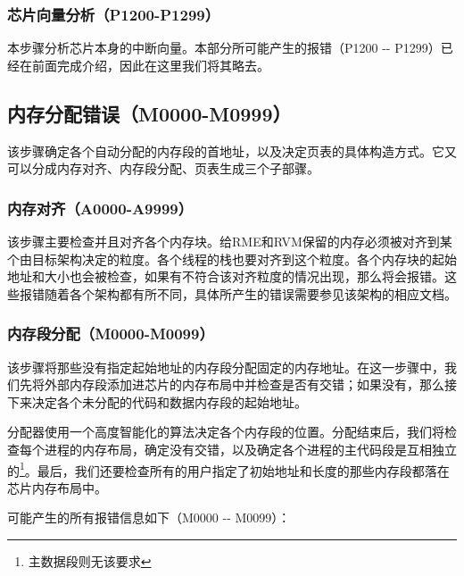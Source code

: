 \subsubsection{芯片向量分析（P1200-P1299）}\label{subsubsec:5-6-3-4}

本步骤分析芯片本身的中断向量。本部分所可能产生的报错（P1200 -\/-
P1299）已经在前面完成介绍，因此在这里我们将其略去。

\subsection{内存分配错误（M0000-M0999）}\label{subsec:5-6-4}

该步骤确定各个自动分配的内存段的首地址，以及决定页表的具体构造方式。它又可以分成内存对齐、内存段分配、页表生成三个子部骤。

\subsubsection{内存对齐（A0000-A9999）}\label{subsubsec:5-6-4-1}

该步骤主要检查并且对齐各个内存块。给RME和RVM保留的内存必须被对齐到某个由目标架构决定的粒度。各个线程的栈也要对齐到这个粒度。各个内存块的起始地址和大小也会被检查，如果有不符合该对齐粒度的情况出现，那么将会报错。这些报错随着各个架构都有所不同，具体所产生的错误需要参见该架构的相应文档。

\subsubsection{内存段分配（M0000-M0099）}\label{subsubsec:5-6-4-2}

该步骤将那些没有指定起始地址的内存段分配固定的内存地址。在这一步骤中，我们先将外部内存段添加进芯片的内存布局中并检查是否有交错；如果没有，那么接下来决定各个未分配的代码和数据内存段的起始地址。

分配器使用一个高度智能化的算法决定各个内存段的位置。分配结束后，我们将检查每个进程的内存布局，确定没有交错，以及确定各个进程的主代码段是互相独立的\footnote{主数据段则无该要求}。最后，我们还要检查所有的用户指定了初始地址和长度的那些内存段都落在芯片内存布局中。

可能产生的所有报错信息如下（M0000 -\/- M0099）：

